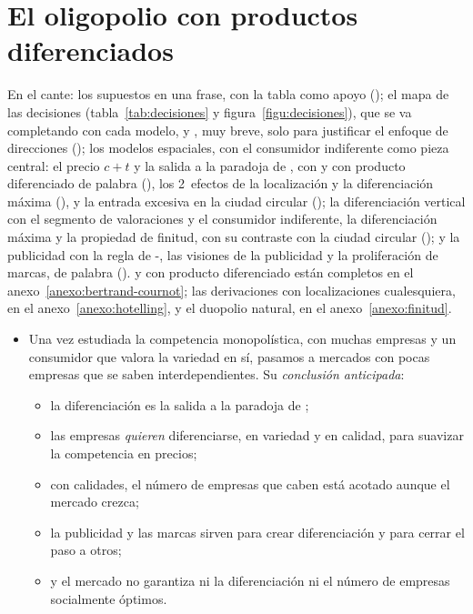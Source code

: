 \documentclass[11pt]{article}
\begin{document}
\section{El oligopolio con productos diferenciados}\label{sec:oligopolio-diferenciado}

\begin{notaopositor}
En el cante: los supuestos en una frase, con la tabla como apoyo (); el mapa de las decisiones (tabla~\ref{tab:decisiones} y figura~\ref{figu:decisiones}), que se va completando con cada modelo, y , muy breve, solo para justificar el enfoque de direcciones (); los modelos espaciales, con el consumidor indiferente como pieza central: el precio $c+t$ y la salida a la paradoja de , con  y  con producto diferenciado de palabra (), los 2~efectos de la localización y la diferenciación máxima (), y la entrada excesiva en la ciudad circular (); la diferenciación vertical con el segmento de valoraciones y el consumidor indiferente, la diferenciación máxima y la propiedad de finitud, con su contraste con la ciudad circular (); y la publicidad con la regla de -, las visiones de la publicidad y la proliferación de marcas, de palabra ().  y  con producto diferenciado están completos en el anexo~\ref{anexo:bertrand-cournot}; las derivaciones con localizaciones cualesquiera, en el anexo~\ref{anexo:hotelling}, y el duopolio natural, en el anexo~\ref{anexo:finitud}.
\end{notaopositor}

\begin{itemize}
\item Una vez estudiada la competencia monopolística, con muchas empresas y un consumidor que valora la variedad en sí, pasamos a mercados con pocas empresas que se saben interdependientes. Su \emph{conclusión anticipada}:
  \begin{itemize}
  \item la diferenciación es la salida a la paradoja de ;
  \item las empresas \emph{quieren} diferenciarse, en variedad y en calidad, para suavizar la competencia en precios;
  \item con calidades, el número de empresas que caben está acotado aunque el mercado crezca;
  \item la publicidad y las marcas sirven para crear diferenciación y para cerrar el paso a otros;
  \item y el mercado no garantiza ni la diferenciación ni el número de empresas socialmente óptimos.
  \end{itemize}
\end{itemize}
\end{document}
